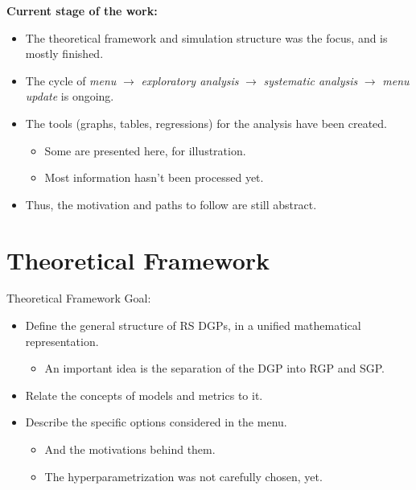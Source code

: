 \documentclass[
  ignorenonframetext,
]{beamer}
\providecommand{\tightlist}{%
  \setlength{\itemsep}{0pt}\setlength{\parskip}{0pt}}\usepackage{longtable,booktabs,array}
\begin{document}
\begin{frame}
\tableofcontents
\end{frame}

\begin{frame}
\textbf{Current stage of the work:}

\begin{itemize}
\tightlist
\item
  The theoretical framework and simulation structure was the focus, and
  is mostly finished.
\item
  The cycle of \emph{menu} \(\to\) \emph{exploratory analysis} \(\to\)
  \emph{systematic analysis} \(\to\) \emph{menu update} is ongoing.
\item
  The tools (graphs, tables, regressions) for the analysis have been
  created.

  \begin{itemize}
  \tightlist
  \item
    Some are presented here, for illustration.
  \item
    Most information hasn't been processed yet.
  \end{itemize}
\item
  Thus, the motivation and paths to follow are still abstract.
\end{itemize}
\end{frame}

\section{Theoretical Framework}\label{theoretical-framework}

\begin{frame}{Theoretical Framework}
\label{theoretical-framework-1}
Goal:

\begin{itemize}
\tightlist
\item
  Define the general structure of RS DGPs, in a unified mathematical
  representation.

  \begin{itemize}
  \tightlist
  \item
    An important idea is the separation of the DGP into RGP and SGP.
  \end{itemize}
\item
  Relate the concepts of models and metrics to it.
\item
  Describe the specific options considered in the menu.

  \begin{itemize}
  \tightlist
  \item
    And the motivations behind them.
  \item
    The hyperparametrization was not carefully chosen, yet.
  \end{itemize}
\end{itemize}
\end{frame}
\end{document}
